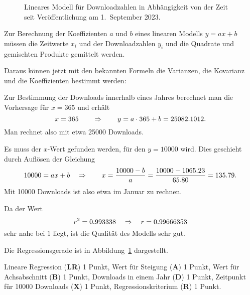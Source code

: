 \begin{loesung}

\begin{figure}
\centering
\def\dx{0.03}
\def\dy{0.2}
\def\p#1#2{ ({(#1)*\dx},{(#2)*\dy}) }
\def\punkt#1#2{ \fill[color=red] \p{#1}{#2} circle[radius=0.1]; }
\caption{Lineares Modell für Downloadzahlen in Abhängigkeit von der Zeit
seit Veröffentlichung am 1.~September 2023.
\label{40000053:fig}}
\end{figure}
Zur Berechnung der Koeffizienten $a$ und $b$ eines linearen Modells
$y=ax+b$
müssen die Zeitwerte $x_i$ und der Downloadzahlen $y_i$
und die Quadrate und gemischten Produkte gemittelt werden.
\begin{center}
\renewcommand\arraystretch{1.1}
\tabelle
\end{center}
Daraus können jetzt mit den bekannten Formeln die Varianzen, die
Kovarianz und die Koeffizienten bestimmt werden:
\resultate
\begin{teilaufgaben}
\item Zur Bestimmung der Downloads innerhalb eines Jahres berechnet man
die Vorhersage für $x=365$ und erhält
\[
x = 365\qquad\Rightarrow\qquad y = a\cdot 365 + b = 25082.1012.
\]
Man rechnet also mit etwa 25000 Downloads.
\item Es muss der $x$-Wert gefunden werden, für den $y=10000$ wird.
Dies geschieht durch Auflösen der Gleichung
\[
10000 = ax+b\quad\Rightarrow\qquad x = \frac{10000-b}{a}= \frac{10000-1065.23}{65.80} = 135.79.
\]
Mit 10000 Downloads ist also etwa im Januar zu rechnen.
\item
Da der Wert 
\[
r^2=0.993338\quad\Rightarrow\quad r = 0.99666353
\]
sehr nahe bei $1$ liegt, ist die Qualität des Modells sehr gut.
\end{teilaufgaben}
Die Regressionsgerade ist in Abbildung~\ref{40000053:fig} dargestellt.
\end{loesung}

\begin{bewertung}
Lineare Regression ({\bf LR}) 1 Punkt,
Wert für Steigung ({\bf A}) 1 Punkt,
Wert für Achsabschnitt ({\bf B}) 1 Punkt,
Downloads in einem Jahr ({\bf D}) 1 Punkt,
Zeitpunkt für 10000 Downloads ({\bf X}) 1 Punkt,
Regressionskriterium ({\bf R}) 1 Punkt.
\end{bewertung}



